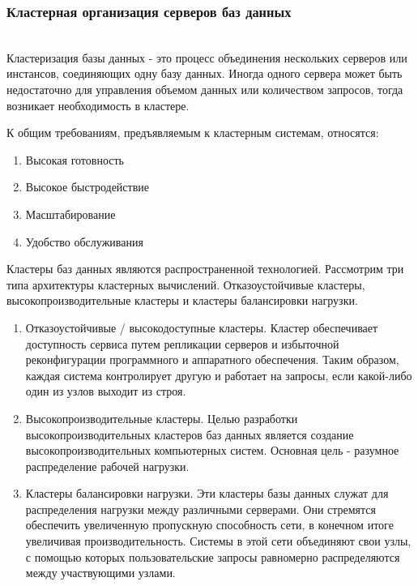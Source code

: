 \subsubsection{Кластерная организация серверов баз данных} ~\\

Кластеризация базы данных - это процесс объединения нескольких серверов или инстансов, соединяющих одну базу данных. Иногда одного сервера может быть недостаточно для управления объемом данных или количеством запросов, тогда возникает необходимость в кластере. 
 
К общим требованиям, предъявляемым к кластерным системам, относятся:
\begin{enumerate}
    \item Высокая готовность
    \item Высокое быстродействие
    \item Масштабирование
    \item Удобство обслуживания
\end{enumerate}

Кластеры баз данных являются распространенной технологией.  Рассмотрим три типа архитектуры кластерных вычислений. Отказоустойчивые кластеры, высокопроизводительные кластеры и кластеры балансировки нагрузки.

\begin{enumerate}
\item Отказоустойчивые / высокодоступные кластеры. Кластер обеспечивает доступность сервиса путем репликации серверов и избыточной реконфигурации программного и аппаратного обеспечения. Таким образом, каждая система контролирует другую и работает на запросы, если какой-либо один из узлов выходит из строя.

\item Высокопроизводительные кластеры. Целью разработки высокопроизводительных кластеров баз данных является создание высокопроизводительных компьютерных систем. Основная цель - разумное распределение рабочей нагрузки.

\item Кластеры балансировки нагрузки. Эти кластеры базы данных служат для распределения нагрузки между различными серверами. Они стремятся обеспечить увеличенную пропускную способность сети, в конечном итоге увеличивая производительность. Системы в этой сети объединяют свои узлы, с помощью которых пользовательские запросы равномерно распределяются между участвующими узлами.
\end{enumerate}

